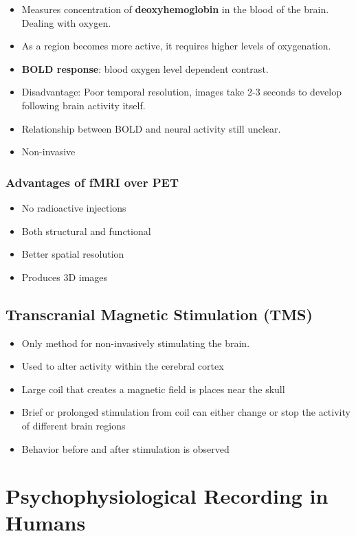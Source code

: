 \documentclass[12pt,a4paper]{article}
\begin{document}
	\begin{itemize}
		\item Measures concentration of \textbf{deoxyhemoglobin} in the blood of the brain. 
		\subitem Dealing with oxygen. 
		\item As a region becomes more active, it requires higher levels of oxygenation. 
		\item \textbf{BOLD response}: blood oxygen level dependent contrast. 
		\item Disadvantage: Poor temporal resolution,  images take 2-3 seconds to develop following brain activity itself. 
		\item Relationship between BOLD and neural activity still unclear. 
		\item Non-invasive
	 \end{itemize}
	 
	 \subsubsection{Advantages of fMRI over PET}
	 
	 \begin{itemize}
	 	\item No radioactive injections
	 	\item Both structural and functional 
	 	\item Better spatial resolution 
	 	\item Produces 3D images 
	 \end{itemize}
	
	\subsection{Transcranial Magnetic Stimulation (TMS)}
	
	\begin{itemize}
		\item Only method for non-invasively stimulating the brain. 
		\item Used to alter activity within the cerebral cortex
		\item Large coil that creates a magnetic field is places near the skull
		\item Brief or prolonged stimulation from coil can either change or stop the activity of different brain regions
		\item Behavior before and after stimulation is observed
	 \end{itemize}
	 
	 \section{Psychophysiological Recording in Humans}
	 
\end{document}

